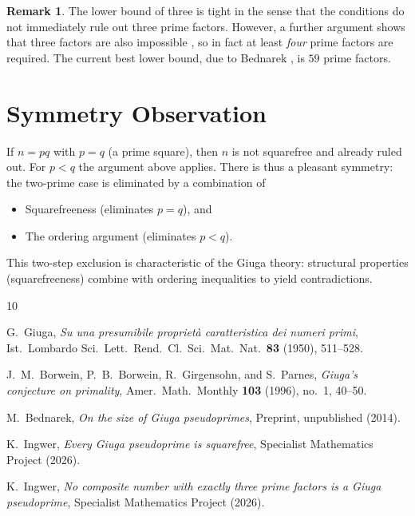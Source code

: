 \documentclass[12pt,a4paper]{amsart}
\theoremstyle{definition}
\newtheorem{remark}[theorem]{Remark}
\begin{document}
\begin{remark}
The lower bound of three is tight in the sense that the conditions do not
immediately rule out three prime factors.  However, a further argument shows
that three factors are also impossible \cite{Ingwer2026a}, so in fact
at least \emph{four} prime factors are required.  The current best lower bound,
due to Bednarek \cite{Bednarek2014}, is $59$ prime factors.
\end{remark}

\section{Symmetry Observation}

If $n = pq$ with $p = q$ (a prime square), then $n$ is not squarefree and already
ruled out.  For $p < q$ the argument above applies.  There is thus a pleasant
symmetry: the two-prime case is eliminated by a combination of
\begin{itemize}
  \item Squarefreeness (eliminates $p = q$), and
  \item The ordering argument (eliminates $p < q$).
\end{itemize}

This two-step exclusion is characteristic of the Giuga theory: structural properties
(squarefreeness) combine with ordering inequalities to yield contradictions.

\begin{thebibliography}{10}

G.~Giuga,
\emph{Su una presumibile propriet\`a caratteristica dei numeri primi},
Ist.\ Lombardo Sci.\ Lett.\ Rend.\ Cl.\ Sci.\ Mat.\ Nat.\ \textbf{83}
(1950), 511--528.

J.~M.~Borwein, P.~B.~Borwein, R.~Girgensohn, and S.~Parnes,
\emph{Giuga's conjecture on primality},
Amer.\ Math.\ Monthly \textbf{103} (1996), no.\ 1, 40--50.

M.~Bednarek,
\emph{On the size of Giuga pseudoprimes},
Preprint, unpublished (2014).

K.~Ingwer,
\emph{Every Giuga pseudoprime is squarefree},
Specialist Mathematics Project (2026).

K.~Ingwer,
\emph{No composite number with exactly three prime factors is a Giuga pseudoprime},
Specialist Mathematics Project (2026).

\end{thebibliography}
\end{document}
